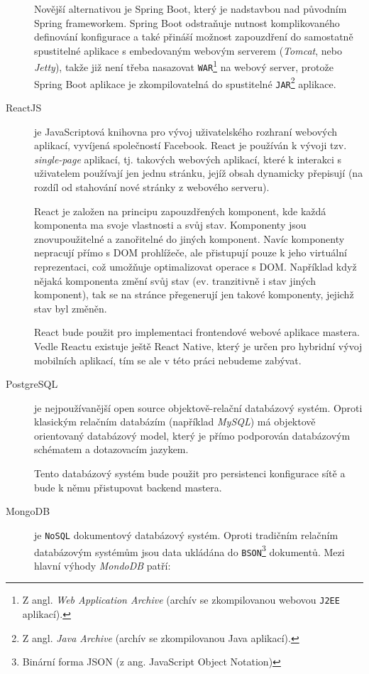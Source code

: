 \begin{description}
    Novější alternativou je Spring Boot, který je nadstavbou nad původním Spring frameworkem. Spring Boot odstraňuje nutnost komplikovaného definování konfigurace a také přináší možnost zapouzdření do samostatně spustitelné aplikace s embedovaným webovým serverem (\textit{Tomcat}, nebo \textit{Jetty}), takže již není třeba nasazovat \texttt{WAR}\footnote{Z angl. \textit{Web Application Archive} (archív se zkompilovanou webovou \texttt{J2EE} aplikací).} na webový server, protože Spring Boot aplikace je zkompilovatelná do spustitelné \texttt{JAR}\footnote{Z angl. \textit{Java Archive} (archív se zkompilovanou Java aplikací).} aplikace.
    
    \item[ReactJS] je JavaScriptová knihovna pro vývoj uživatelského rozhraní webových aplikací, vyvíjená společností Facebook. React je používán k vývoji tzv. \textit{single-page} aplikací, tj. takových webových aplikací, které k interakci s uživatelem používají jen jednu stránku, jejíž obsah dynamicky přepisují (na rozdíl od stahování nové stránky z webového serveru).
    
    React je založen na principu zapouzdřených komponent, kde každá komponenta ma svoje vlastnosti a svůj stav. Komponenty jsou znovupoužitelné a zanořitelné do jiných komponent. Navíc komponenty nepracují přímo s DOM prohlížeče, ale přistupují pouze k jeho virtuální reprezentaci, což umožňuje optimalizovat operace s DOM. Například když nějaká komponenta změní svůj stav (ev. tranzitivně i stav jiných komponent), tak se na stránce přegenerují jen takové komponenty, jejichž stav byl změněn.

    React bude použit pro implementaci frontendové webové aplikace mastera. Vedle Reactu existuje ještě React Native, který je určen pro hybridní vývoj mobilních aplikací, tím se ale v této práci nebudeme zabývat.
    
    \item[PostgreSQL] je nejpoužívanější open source objektově-relační databázový systém. Oproti klasickým relačním databázím (například \textit{MySQL}) má objektově orientovaný databázový model, který je přímo podporován databázovým schématem a dotazovacím jazykem.
    
    Tento databázový systém bude použit pro persistenci konfigurace sítě a bude k němu přistupovat backend mastera.
    
    \item[MongoDB]\label{chap:arch:technologie:mongodb} je \texttt{NoSQL} dokumentový databázový systém. Oproti tradičním relačním databázovým systémům jsou data ukládána do \texttt{BSON}\footnote{Binární forma JSON (z ang. JavaScript Object Notation)} dokumentů. Mezi hlavní výhody \textit{MondoDB} patří:


\end{description}

